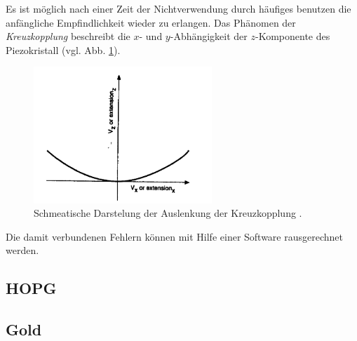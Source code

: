 Es ist möglich nach einer Zeit der Nichtverwendung
durch häufiges benutzen die anfängliche Empfindlichkeit wieder zu erlangen.
Das Phänomen der \emph{Kreuzkopplung} beschreibt die $x$- und $y$-Abhängigkeit der $z$-Komponente des Piezokristall (vgl. Abb. \ref{fig: cross_copeling}).
\begin{figure}[h]
  \centering
  \includegraphics[width=0.6\textwidth]{./pics/cross_copling.png}
  \caption{Schmeatische Darstelung der Auslenkung der Kreuzkopplung \cite{rtm}.}
  \label{fig: cross_copeling}
\end{figure}
Die damit verbundenen Fehlern können mit Hilfe einer Software rausgerechnet werden.

\subsection{HOPG}

\subsection{Gold}
